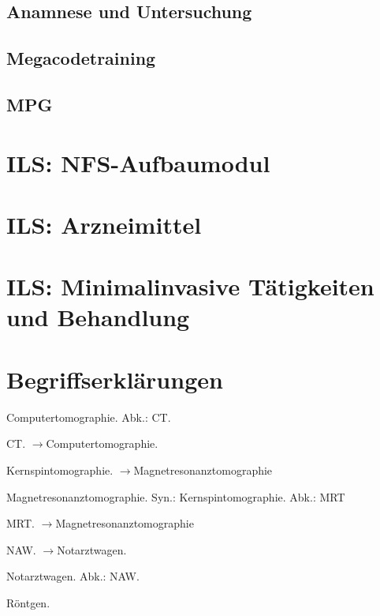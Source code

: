 \documentclass{article}
\begin{document}
\subsection{Anamnese und Untersuchung}
\subsection{Megacodetraining}
\subsection{MPG}
\section{ILS: NFS-Aufbaumodul}
\section{ILS: Arzneimittel}
\section{ILS: Minimalinvasive T\"atigkeiten und Behandlung}
\section{Begriffserkl\"arungen}
\label{bkm:LexComputertomographie}Computertomographie. Abk.: CT. 

CT. ${\rightarrow}$Computertomographie.

Kernspintomographie. ${\rightarrow}$Magnetresonanztomographie

Magnetresonanztomographie. Syn.: Kernspintomographie. Abk.: MRT

MRT. ${\rightarrow}$Magnetresonanztomographie

NAW. ${\rightarrow}$Notarztwagen.

Notarztwagen. Abk.: NAW.

R\"ontgen. 
\end{document}
